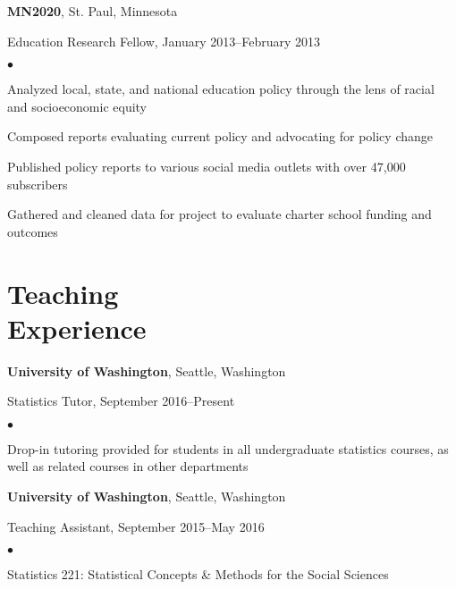 \documentclass[margin,centered]{res}
\newenvironment{list1}{
  \begin{list}{\ding{113}}{%
      \setlength{\itemsep}{0in}
      \setlength{\parsep}{0in} \setlength{\parskip}{0in}
      \setlength{\topsep}{0in} \setlength{\partopsep}{0in}
      \setlength{\leftmargin}{0.17in}}}{\end{list}}
\newenvironment{list2}{
  \begin{list}{$\bullet$}{%
      \setlength{\itemsep}{0in}
      \setlength{\parsep}{0in} \setlength{\parskip}{0in}
      \setlength{\topsep}{0in} \setlength{\partopsep}{0in}
      \setlength{\leftmargin}{0.2in}}}{\end{list}}
\begin{document}
\begin{resume}
{\bf MN2020}, St. Paul, Minnesota
\begin{list1}
\item[] 
Education Research Fellow, January 2013--February 2013
\begin{list2}
\vspace*{.05in}
\item Analyzed local, state, and national education policy through the lens of racial and socioeconomic equity
\item Composed reports evaluating current policy and advocating for policy change
\item Published policy reports to various social media outlets with over 47,000 subscribers
\item Gathered and cleaned data for project to evaluate charter school funding and outcomes
\end{list2}
\end{list1}

\section{\sc Teaching \\ Experience}

{\bf University of Washington}, Seattle, Washington
\begin{list1}
\item[] Statistics Tutor, September 2016--Present
\begin{list2}
\vspace*{.05in}
\item Drop-in tutoring provided for students in all undergraduate statistics courses, as well as related courses in other departments
\end{list2}
\end{list1}

{\bf University of Washington}, Seattle, Washington
\begin{list1}
\item[] Teaching Assistant, September 2015--May 2016
\begin{list2}
\vspace*{.05in}
\item Statistics 221: Statistical Concepts \& Methods for the Social Sciences
\end{list2}
\end{list1}



\end{resume}
\end{document}
